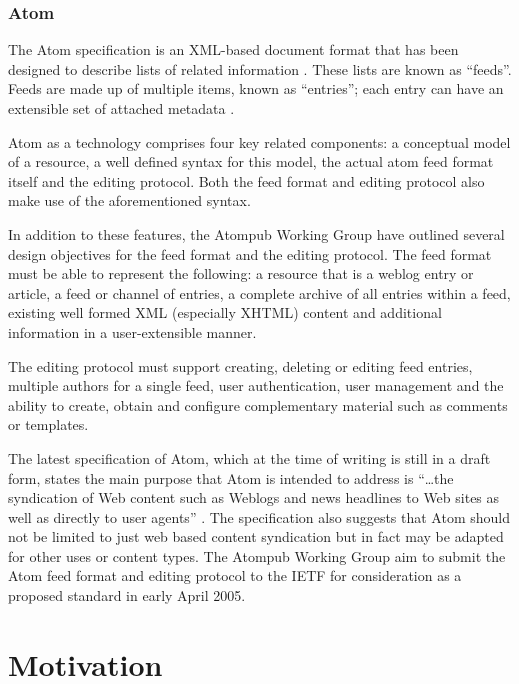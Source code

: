 \documentclass{CRPITStyle}
\begin{document}
\subsubsection{Atom}
\label{sec-atom-detail}

The Atom  specification is an XML-based document format that has been
designed to describe lists of related information
\cite{Nott-M-2005-Atom}. These lists are known as ``feeds''. Feeds are
made up of multiple items, known as ``entries''; each entry can have an
extensible set of attached metadata \cite{Nott-M-2005-Atom}.

Atom as a technology comprises four key related components: a conceptual
model of a resource, a well defined syntax for this model, the actual
atom feed format itself and the editing protocol. Both the feed format
and editing protocol also make use of the aforementioned syntax.

In addition to these features, the Atompub Working Group have outlined
several design objectives for the feed format and the editing protocol.
The feed format must be able to represent the following: a resource that
is a weblog entry or article, a feed or channel of entries, a complete
archive of all entries within a feed, existing well formed XML
(especially XHTML) content and additional information in a
user-extensible manner.

The editing protocol must support creating, deleting or editing feed
entries, multiple authors for a single feed, user authentication, user
management and the ability to create, obtain and configure complementary
material such as comments or templates.

The latest specification of Atom, which at the time of writing is still
in a draft form, states the main purpose that Atom is intended to
address is ``\ldots{}the syndication of Web content such as Weblogs and
news headlines to Web sites as well as directly to user agents''
\cite{Nott-M-2005-Atom}. The specification also suggests that Atom
should not be limited to just web based content syndication but in fact
may be adapted for other uses or content types. The Atompub Working
Group aim to submit the Atom feed format and editing protocol to the
IETF for consideration as a proposed standard in early April 2005.


\section{Motivation}
\label{sec-motivation}
\end{document}
